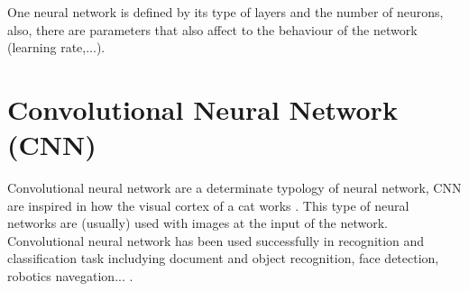 One neural network is defined by its type of layers and the number of neurons, also, there are parameters that also affect to the behaviour of the network (learning rate,...)\cite{Lecum2}.\\



\section{Convolutional Neural Network (CNN)}
Convolutional neural network are a determinate typology of neural network, CNN are inspired in how the visual cortex of a cat works \cite{Doorn}. This type of neural networks are (usually) used with images at the input of the network.\\

Convolutional neural network has been used successfully in recognition and classification task includying document and object recognition, face detection, robotics navegation... \cite{Lecum2, Lecum3}.\\
